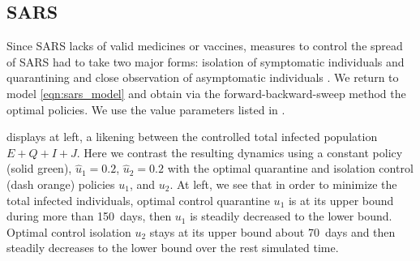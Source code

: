 \subsection*{SARS}
  Since SARS lacks of valid medicines or vaccines, measures to control the 
spread of SARS had to take two major forms: isolation of symptomatic 
individuals and quarantining and close observation of asymptomatic 
individuals \cite{who_sars}. We return to model \eqref{eqn:sars_model} and 
obtain via the forward-backward-sweep method the optimal policies. We use the 
value parameters listed in .

   displays at left, a likening between the controlled 
total infected population $E + Q + I + J$. Here we contrast the resulting
dynamics using a constant policy (solid green), $\widehat{u}_1 = \num{0.2}$,
$\widehat{u}_2 = \num{0.2}$ with the optimal quarantine and isolation control 
(dash orange) policies $u_1$, and $u_2$. At left, we see that in order to 
minimize the total infected individuals, optimal control quarantine $u_1$ is at 
its upper bound during more than \SI{150}{days}, then $u_1$ is steadily 
decreased to the lower bound. Optimal control isolation $u_2$ stays at its 
upper bound about \SI{70}{days} and then steadily decreases to the lower bound 
over the rest simulated time.

